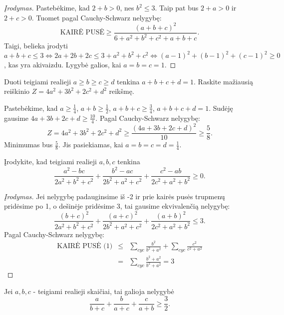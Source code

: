 \begin{proof}[Įrodymas]
  Pastebėkime, kad $2+b>0$, nes $b^2\leq3$. Taip pat bus $2+a>0$ ir $2+c>0$.
  Tuomet pagal Cauchy-Schwarz nelygybę:
  $$\mbox{KAIRĖ PUSĖ}\geq\frac{(a+b+c)^2}{6+a^2+b^2+c^2+a+b+c}.$$ Taigi,
  belieka įrodyti $a+b+c\leq3\Leftrightarrow
  2a+2b+2c\leq3+a^2+b^2+c^2\Leftrightarrow (a-1)^2+(b-1)^2+(c-1)^2\geq0$, kas
  yra akivaizdu. Lygybė galios, kai $a=b=c=1$.
\end{proof}

\begin{pavnr}
  Duoti teigiami realieji $a\geq b\geq c\geq d$ tenkina $a+b+c+d=1$. Raskite
  mažiausią reiškinio $Z=4a^2+3b^2+2c^2+d^2$ reikšmę.
\end{pavnr}

\begin{sprendimas}
  Pastebėkime, kad $a\geq\frac{1}{4}$, $a+b\geq\frac{1}{2}$,
  $a+b+c\geq\frac{3}{4}$, $a+b+c+d=1$. Sudėję gausime
  $4a+3b+2c+d\geq\frac{10}{4}$. Pagal Cauchy-Schwarz nelygybę:
  $$Z=4a^2+3b^2+2c^2+d^2\geq\frac{(4a+3b+2c+d)^2}{10}\geq\frac{5}{8}.$$
  Minimumas bus $\frac{5}{8}$. Jis pasiekiamas, kai $a=b=c=d=\frac{1}{4}$.
\end{sprendimas}

\begin{pavnr}
  Įrodykite, kad teigiami realieji $a,b,c$ tenkina
  $$\frac{a^2-bc}{2a^2+b^2+c^2}+\frac{b^2-ac}{2b^2+a^2+c^2}+\frac{c^2-ab}{2c^2+a^2+b^2}\geq0.$$
\end{pavnr}

\begin{proof}[Įrodymas]
  Jei nelygybę padauginsime iš -2 ir prie kairės pusės trupmenų pridėsime
  po 1, o dešinėje pridėsime 3, tai gausime ekvivalenčią nelygybę:
  \begin{equation*}\frac{(b+c)^2}{2a^2+b^2+c^2}+\frac{(a+c)^2}{2b^2+a^2+c^2}+\frac{(a+b)^2}{2c^2+a^2+b^2}\leq3. \tag{1}
  \end{equation*}
  Pagal Cauchy-Schwarz nelygybę:
  \begin{eqnarray*} \mbox{KAIRĖ PUSĖ (1)}&\leq&\sum_{cyc}{\frac{b^2}{b^2+a^2}}+\sum_{cyc}{\frac{c^2}{c^2+a^2}} \\
    &=&\sum_{cyc}{\frac{b^2+a^2}{b^2+a^2}}=3
  \end{eqnarray*}
\end{proof}

\begin{pavnr}
  Jei $a,b,c$ - teigiami realieji skaičiai, tai galioja nelygybė
  $$\frac{a}{b+c}+\frac{b}{a+c}+\frac{c}{a+b}\geq\frac{3}{2}.$$
\end{pavnr}

